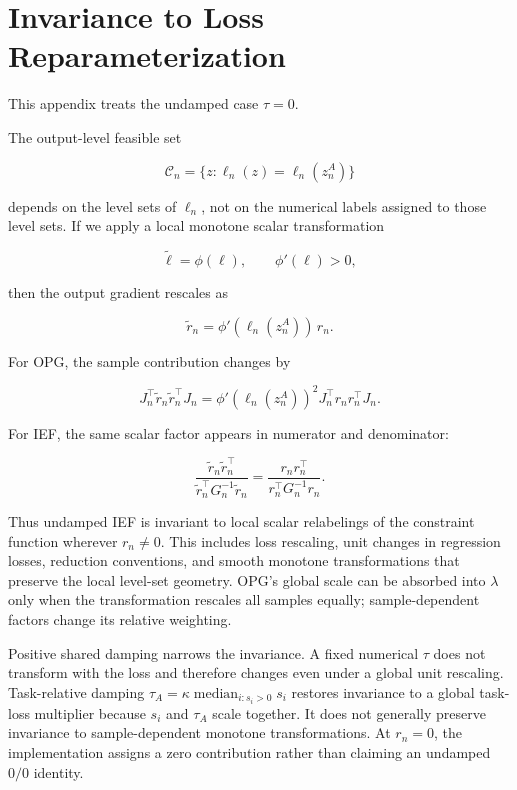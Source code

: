 \section{Invariance to Loss Reparameterization}

This appendix treats the undamped case $\tau=0$.

The output-level feasible set

\[
\mathcal C_n=\{z:\ell_n(z)=\ell_n(z_n^A)\}
\]

depends on the level sets of $\ell_n$, not on the numerical labels assigned to those level sets. If we apply a local monotone scalar transformation

\[
\tilde \ell=\phi(\ell),
\qquad
\phi'(\ell)>0,
\]

then the output gradient rescales as

\[
\tilde r_n
=
\phi'(\ell_n(z_n^A))\,r_n.
\]

For OPG, the sample contribution changes by

\[
J_n^\top \tilde r_n\tilde r_n^\top J_n
=
\phi'(\ell_n(z_n^A))^2
J_n^\top r_nr_n^\top J_n.
\]

For IEF, the same scalar factor appears in numerator and denominator:

\[
\frac{\tilde r_n\tilde r_n^\top}
{\tilde r_n^\top G_n^{-1}\tilde r_n}
=
\frac{r_nr_n^\top}
{r_n^\top G_n^{-1}r_n}.
\]

Thus undamped IEF is invariant to local scalar relabelings of the constraint function wherever $r_n\ne0$. This includes loss rescaling, unit changes in regression losses, reduction conventions, and smooth monotone transformations that preserve the local level-set geometry. OPG's global scale can be absorbed into $\lambda$ only when the transformation rescales all samples equally; sample-dependent factors change its relative weighting.

Positive shared damping narrows the invariance. A fixed numerical $\tau$ does not transform with the loss and therefore changes even under a global unit rescaling. Task-relative damping $\tau_A=\kappa\operatorname{median}_{i:s_i>0}s_i$ restores invariance to a global task-loss multiplier because $s_i$ and $\tau_A$ scale together. It does not generally preserve invariance to sample-dependent monotone transformations. At $r_n=0$, the implementation assigns a zero contribution rather than claiming an undamped $0/0$ identity.
